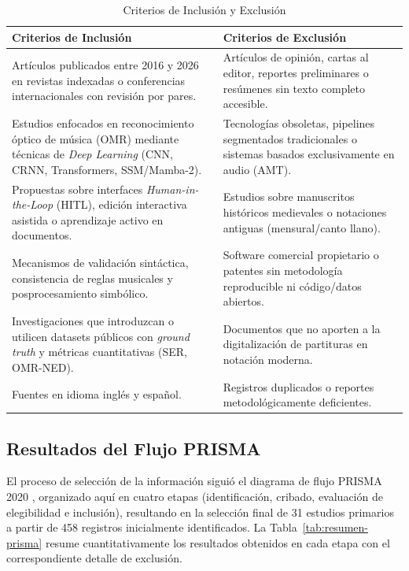 \documentclass[conference]{IEEEtran}
\begin{document}
\begin{table}[htbp]
\caption{Criterios de Inclusión y Exclusión}
\label{tab:criterios-prisma}
\centering
\footnotesize
\begin{tabular}{|p{3.8cm}|p{3.8cm}|}
\hline
\textbf{Criterios de Inclusión} & \textbf{Criterios de Exclusión} \\
\hline
Artículos publicados entre 2016 y 2026 en revistas indexadas o conferencias internacionales con revisión por pares. & Artículos de opinión, cartas al editor, reportes preliminares o resúmenes sin texto completo accesible. \\
\hline
Estudios enfocados en reconocimiento óptico de música (OMR) mediante técnicas de \emph{Deep Learning} (CNN, CRNN, Transformers, SSM/Mamba-2). & Tecnologías obsoletas, pipelines segmentados tradicionales o sistemas basados exclusivamente en audio (AMT). \\
\hline
Propuestas sobre interfaces \emph{Human-in-the-Loop} (HITL), edición interactiva asistida o aprendizaje activo en documentos. & Estudios sobre manuscritos históricos medievales o notaciones antiguas (mensural/canto llano). \\
\hline
Mecanismos de validación sintáctica, consistencia de reglas musicales y posprocesamiento simbólico. & Software comercial propietario o patentes sin metodología reproducible ni código/datos abiertos. \\
\hline
Investigaciones que introduzcan o utilicen datasets públicos con \emph{ground truth} y métricas cuantitativas (SER, OMR-NED). & Documentos que no aporten a la digitalización de partituras en notación moderna. \\
\hline
Fuentes en idioma inglés y español. & Registros duplicados o reportes metodológicamente deficientes. \\
\hline
\end{tabular}
\end{table}

\subsection{Resultados del Flujo PRISMA}
\label{sec:resultados-prisma}

El proceso de selección de la información siguió el diagrama de flujo PRISMA 2020 \cite{prisma2020}, organizado aquí en cuatro etapas (identificación, cribado, evaluación de elegibilidad e inclusión), resultando en la selección final de 31 estudios primarios a partir de 458 registros inicialmente identificados. La Tabla~\ref{tab:resumen-prisma} resume cuantitativamente los resultados obtenidos en cada etapa con el correspondiente detalle de exclusión.
\end{document}
